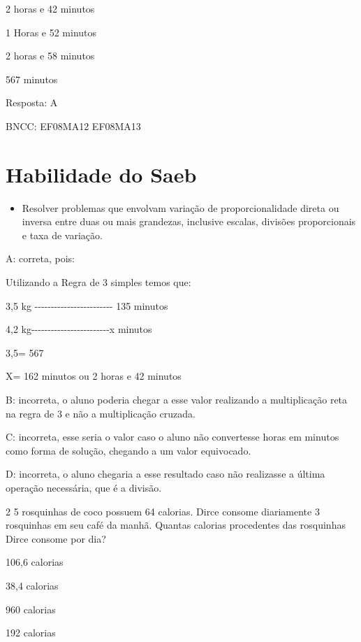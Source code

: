 \item 2 horas e 42 minutos
\item 1 Horas e 52 minutos
\item 2 horas e 58 minutos
\item 567 minutos

Resposta: A

BNCC: EF08MA12 EF08MA13

\section{Habilidade do Saeb}

\begin{itemize}
\tightlist

\item 
  Resolver problemas que envolvam variação de proporcionalidade direta
  ou inversa entre duas ou mais grandezas, inclusive escalas, divisões
  proporcionais e taxa de variação.
\end{itemize}

A: correta, pois:

Utilizando a Regra de 3 simples temos que:

3,5 kg
-\/-\/-\/-\/-\/-\/-\/-\/-\/-\/-\/-\/-\/-\/-\/-\/-\/-\/-\/-\/-\/-\/-\/-
135 minutos

4,2
kg-\/-\/-\/-\/-\/-\/-\/-\/-\/-\/-\/-\/-\/-\/-\/-\/-\/-\/-\/-\/-\/-\/-\/-x
minutos

3,5\times \times = 567

X= 162 minutos ou 2 horas e 42 minutos

B: incorreta, o aluno poderia chegar a esse valor realizando a
multiplicação reta na regra de 3 e não a multiplicação cruzada.

C: incorreta, esse seria o valor caso o aluno não convertesse horas em
minutos como forma de solução, chegando a um valor equivocado.

D: incorreta, o aluno chegaria a esse resultado caso não realizasse a
última operação necessária, que é a divisão.

\num{2} 5 rosquinhas de coco possuem 64 calorias. Dirce consome diariamente 3
rosquinhas em seu café da manhã. Quantas calorias procedentes das
rosquinhas Dirce consome por dia?

\item 106,6 calorias
\item 38,4 calorias
\item 960 calorias
\item 192 calorias

